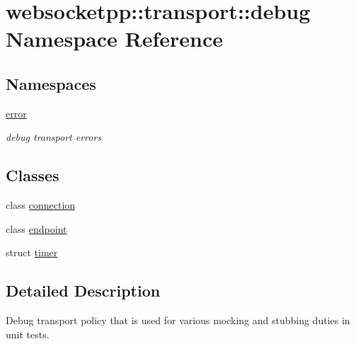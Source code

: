 \hypertarget{namespacewebsocketpp_1_1transport_1_1debug}{}\section{websocketpp\+:\+:transport\+:\+:debug Namespace Reference}
\label{namespacewebsocketpp_1_1transport_1_1debug}
\subsection*{Namespaces}
\begin{DoxyCompactItemize}
\item 
 \hyperlink{namespacewebsocketpp_1_1transport_1_1debug_1_1error}{error}
\begin{DoxyCompactList}\small\item\em debug transport errors \end{DoxyCompactList}\end{DoxyCompactItemize}
\subsection*{Classes}
\begin{DoxyCompactItemize}
\item 
class \hyperlink{classwebsocketpp_1_1transport_1_1debug_1_1connection}{connection}
\item 
class \hyperlink{classwebsocketpp_1_1transport_1_1debug_1_1endpoint}{endpoint}
\item 
struct \hyperlink{structwebsocketpp_1_1transport_1_1debug_1_1timer}{timer}
\end{DoxyCompactItemize}


\subsection{Detailed Description}
Debug transport policy that is used for various mocking and stubbing duties in unit tests. 